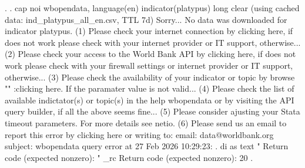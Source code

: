 . 
. cap noi wbopendata, language(en) indicator(platypus) long clear
(using cached data: ind_platypus_all_en.csv, TTL 7d)
{\smallskip}
    Sorry... No data was downloaded for indicator platypus.
{\smallskip}
    (1) Please check your internet connection by clicking here, if does not
    work please check with your internet provider or IT support, otherwise...
    (2) Please check your access to the World Bank API by clicking here, if
    does not work please check with your firewall settings or internet
    provider or IT support, otherwise...
    (3) Please check the availability of your indicator or topic by {\lbr}browse ""
    :clicking here{\rbr}. If the paramater value is not valid...
    (4) Please check the list of available indictator(s) or topic(s) in the
    help wbopendata or by visiting the API query builder, if all the above
    seems fine...
    (5) Please consider ajusting your Stata timeout parameters. For more
    details see netio.
    (6) Please send us an email to report this error by clicking here or
    writing to:
            email: data@worldbank.org
            subject: wbopendata query error at 27 Feb 2026 10:29:23:
{\smallskip}
{\smallskip}
{\smallskip}
. di as text "  Return code (expected nonzero): " _rc
  Return code (expected nonzero): 20
{\smallskip}
. 

